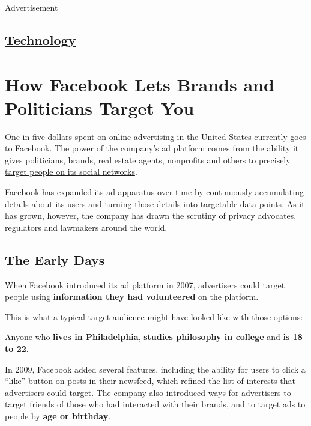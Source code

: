 Advertisement

\hypertarget{-technology-}{%
\subsection{\texorpdfstring{
\href{https://www.nytimes3xbfgragh.onion/section/technology}{Technology}
}{ Technology }}\label{-technology-}}

\hypertarget{how-facebook-lets-brands-and-politicians-target-you}{%
\section{How Facebook Lets Brands and Politicians Target
You}\label{how-facebook-lets-brands-and-politicians-target-you}}

One in five dollars spent on online advertising in the United States
currently goes to Facebook. The power of the company's ad platform comes
from the ability it gives politicians, brands, real estate agents,
nonprofits and others to precisely
\href{https://www.nytimes3xbfgragh.onion/2018/04/11/technology/facebook-privacy-hearings.html}{target
people on its social networks}.

Facebook has expanded its ad apparatus over time by continuously
accumulating details about its users and turning those details into
targetable data points. As it has grown, however, the company has drawn
the scrutiny of privacy advocates, regulators and lawmakers around the
world.

\hypertarget{the-early-days}{%
\subsection{The Early Days}\label{the-early-days}}

When Facebook introduced its ad platform in 2007, advertisers could
target people using \textbf{information they had volunteered} on the
platform.

This is what a typical target audience might have looked like with those
options:

Anyone who \textbf{lives in Philadelphia}, \textbf{studies philosophy in
college} and \textbf{is 18 to 22}.

In 2009, Facebook added several features, including the ability for
users to click a ``like'' button on posts in their newsfeed, which
refined the list of interests that advertisers could target. The company
also introduced ways for advertisers to target friends of those who had
interacted with their brands, and to target ads to people by \textbf{age
or birthday}.

